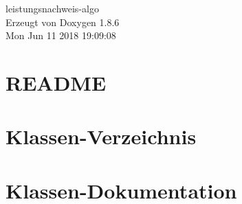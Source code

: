 \documentclass[twoside]{book}
\newcommand{\clearemptydoublepage}{%
  \newpage{\pagestyle{empty}\cleardoublepage}%
}
\begin{document}
\hypersetup{pageanchor=false}
\begin{titlepage}
\vspace*{7cm}
\begin{center}%
{\Large leistungsnachweis-\/algo }\\
\vspace*{1cm}
{\large Erzeugt von Doxygen 1.8.6}\\
\vspace*{0.5cm}
{\small Mon Jun 11 2018 19:09:08}\\
\end{center}
\end{titlepage}
\clearemptydoublepage
\tableofcontents
\clearemptydoublepage
{}
\hypersetup{pageanchor=true}

\chapter{R\-E\-A\-D\-M\-E}
\label{md__home_travis_build_ob-algdatii-ss18_leistungsnachweis-algo__r_e_a_d_m_e}
\hypertarget{md__home_travis_build_ob-algdatii-ss18_leistungsnachweis-algo__r_e_a_d_m_e}{}

\chapter{Klassen-\/\-Verzeichnis}

\chapter{Klassen-\/\-Dokumentation}



\newpage
{}
{}
\printindex
\end{document}
